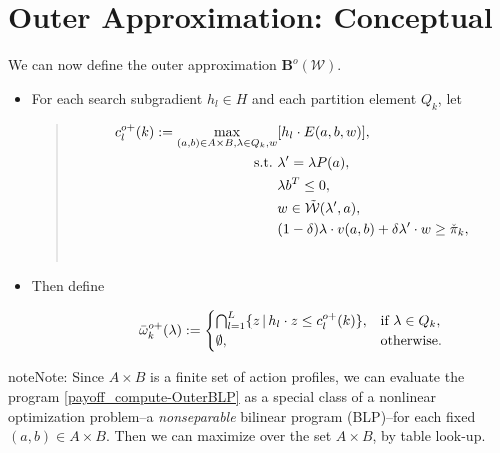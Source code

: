 \documentclass[a4paper,10pt,english]{sphinxmanual}
\begin{document}
\section{Outer Approximation: Conceptual}
\label{payoff_compute:outer-concept}\label{payoff_compute:outer-approximation-conceptual}
We can now define the outer approximation $\mathbf{B}^o(\mathcal{W})$.
\begin{itemize}
\item {} 
For each search subgradient $h_l\in H$ and each partition element $Q_k$, let
\begin{quote}
\label{payoff_compute:equation-OuterBLP}\begin{gather}
\begin{split}c^{o+}_l(k):=\max_{(a,b) \in A \times B,\lambda\in Q_k, w}& [h_l \cdot E(a,b,w)],
\\
\text{s.t.}\,\,&\lambda'=\lambda P(a),
\\
& \lambda b^T \leq 0,
\\
& w\in \tilde{\mathcal{W}}(\lambda', a),
\\
& (1-\delta)\lambda \cdot v(a,b)+\delta \lambda' \cdot w\geq \check{\pi}_k,\end{split}\label{payoff_compute-OuterBLP}\\\begin{split}\end{split}\notag
\end{gather}\end{quote}

\item {} \begin{description}
\item[{Then define}] \leavevmode\begin{gather}
\begin{split}\bar{\omega}^{o+}_k (\lambda) :=
\begin{cases}
\bigcap_{l=1}^L \{z\,|\, h_l\cdot z\leq  c^{o+}_l(k)\},& \text{if} \ \lambda \in Q_k,\\
\emptyset, & \text{otherwise}.
\end{cases}\end{split}\notag
\end{gather}
\end{description}

\end{itemize}

\begin{notice}{note}{Note:}
Since $A \times B$ is a finite set of action profiles, we can evaluate the program \eqref{payoff_compute-OuterBLP} as a special class of a nonlinear optimization problem--a \emph{nonseparable} bilinear program (BLP)--for each fixed $(a,b) \in A \times B$. Then we can maximize over the set $A \times B$, by table look-up.
\end{notice}
\end{document}
